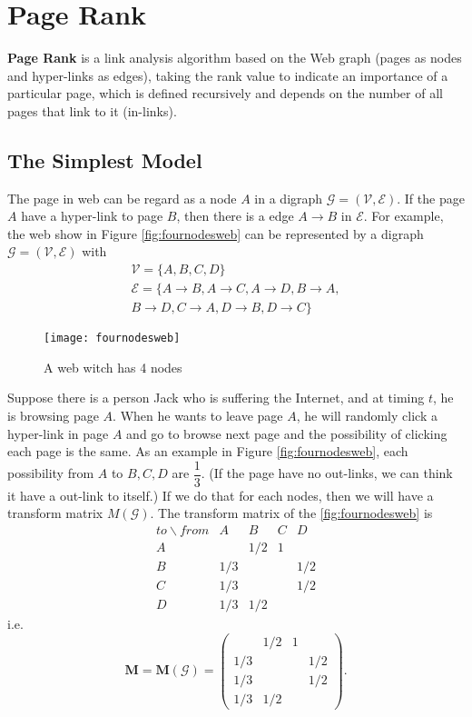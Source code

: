 \section{Page Rank}
	\textbf{Page Rank} is a link analysis algorithm based on the Web graph (pages as nodes and hyper-links as edges), taking the rank value to indicate an importance of a particular page, which is defined recursively and	depends on the number of all pages that link to it (in-links).

	\subsection{The Simplest Model}
	The page in web can be regard as a node $A$ in a digraph $\mathcal G=(\mathcal V,\mathcal E)$. If the page $A$ have a hyper-link to page $B$, then there is a edge $A\rightarrow B$ in $\mathcal E$. For example, the web show in Figure \eqref{fig:fournodesweb} can be represented by a digraph $\mathcal G=(\mathcal V,\mathcal E)$ with
	\begin{gather*}
	\mathcal{V} =\{A,B,C,D\}\\
	\mathcal{E} =\{A\rightarrow B, A\rightarrow C,A\rightarrow D,B\rightarrow A,\\ B\rightarrow D,C\rightarrow A,D\rightarrow B,D\rightarrow C\}
	\end{gather*}
	\begin{figure}[h]
		\centering
		\texttt{[image: fournodesweb]}
		\caption{A web witch has 4 nodes}
		\label{fig:fournodesweb}
	\end{figure}
	
	Suppose there is a person Jack who is suffering the Internet, and at timing $t$, he is browsing page $A$. When he wants to leave page $A$, he will randomly click a hyper-link in page $A$ and go to browse next page and the possibility of clicking each page is the same. As an example in Figure \eqref{fig:fournodesweb}, each possibility from $A$ to $B,C,D$ are $\dfrac 13$. (If the page have no out-links, we can think it have a out-link to itself.) If we do that for each nodes, then we will have a transform matrix $M(\mathcal G)$. The transform matrix of the \eqref{fig:fournodesweb} is
	\begin{equation*}
		\begin{matrix}
		 to\backslash from&A&B&C&D\\
		A& &1/2 &1 &\\
		B&1/3 & & &1/2\\
		C&1/3 & & &1/2\\
		D&1/3 &1/2 & &
		\end{matrix}
	\end{equation*}
	i.e. 
	\begin{equation*}
	\mathbf M=\mathbf M(\mathcal{G})=
	\begin{pmatrix}
	 &1/2 &1 &\\
1/3 & & &1/2\\
1/3 & & &1/2\\
1/3 &1/2 & &
	\end{pmatrix}.
	\end{equation*}
	
